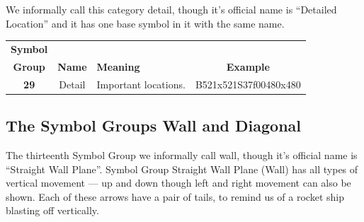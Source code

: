 \documentclass{article}
\begin{document}
We informally call this category detail, though it's official name is ``Detailed Location'' and it has one base symbol in it with the same name.

\begin{center}
\begin{tabular}{ccp{21mm}c}
\textbf{Symbol}\\
\textbf{Group}&\textbf{Name}&\textbf{Meaning}&\textbf{Example}\\
\textbf{29}&Detail&Important locations.&B521x521S37f00480x480\\
\end{tabular}
\end{center}

\subsection{The Symbol Groups Wall and Diagonal}

The thirteenth Symbol Group we informally call wall, though it's official name is ``Straight Wall Plane''.
Symbol Group Straight Wall Plane (Wall) has all types of vertical movement --- up and down though left and right movement can also be shown.
Each of these arrows have a pair of tails, to remind us of a rocket ship blasting off vertically.
\end{document}
